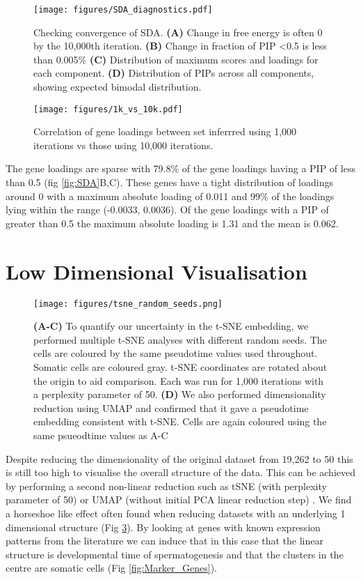 \begin{figure}[H]
	\centering
	\texttt{[image: figures/SDA\_diagnostics.pdf]}
	\caption{Checking convergence of SDA.
		\textbf{(A)} Change in free energy is often 0 by the 10,000th iteration.
		\textbf{(B)} Change in fraction of PIP <0.5 is less than 0.005\%
		\textbf{(C)} Distribution of maximum scores and loadings for each component.
		\textbf{(D)} Distribution of PIPs across all components, showing expected bimodal distribution.}
	\label{fig:SDA_diagnostics}
\end{figure}

\begin{figure}[H]
	\centering
	\texttt{[image: figures/1k\_vs\_10k.pdf]}
	\caption{Correlation of gene loadings between set inferrred using 1,000 iterations vs those using 10,000 iterations.}
	\label{fig:10k}
\end{figure}


The gene loadings are sparse with 79.8\% of the gene loadings having a PIP of less than 0.5 (fig \ref{fig:SDA}B,C). These genes have a tight distribution of loadings around 0 with a maximum absolute loading of 0.011 and 99\% of the loadings lying within the range (-0.0033, 0.0036). Of the gene loadings with a PIP of greater than 0.5 the maximum absolute loading is 1.31 and the mean is 0.062.


\section{Low Dimensional Visualisation}

\begin{figure}[H]
	\centering
	\texttt{[image: figures/tsne\_random\_seeds.png]}
	\caption{
		\textbf{(A-C)} To quantify our uncertainty in the t-SNE embedding, we performed multiple t-SNE analyses with different random seeds. The cells are coloured by the same pseudotime values used throughout. Somatic cells are coloured gray. t-SNE coordinates are rotated about the origin to aid comparison. Each was run for 1,000 iterations with a perplexity parameter of 50.
		\textbf{(D)} We also performed dimensionality reduction using UMAP and confirmed that it gave a pseudotime embedding consistent with t-SNE. Cells are again coloured using the same psueodtime values as A-C}
	\label{fig:tSNEseeds}
\end{figure}

Despite reducing the dimensionality of the original dataset from 19,262 to 50 this is still too high to visualise the overall structure of the data. This can be achieved by performing a second non-linear reduction such as tSNE (with perplexity parameter of 50) or UMAP (without initial PCA linear reduction step) \cite{Maaten2008Visualizing, McInnes2018UMAPa, Becht2018Dimensionality}. We find a horseshoe like effect often found when reducing datasets with an underlying 1 dimensional structure \cite{Novembre2008Interpreting, Podani2002RESEMBLANCE} (Fig \ref{fig:tSNEseeds}). By looking at genes with known expression patterns from the literature we can induce that in this case that the linear structure is developmental time of spermatogenesis and that the clusters in the centre are somatic cells (Fig \ref{fig:Marker_Genes}).


